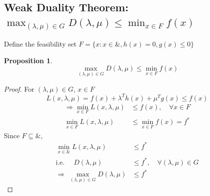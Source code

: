 \documentclass[11pt,a4paper]{article}
\newtheorem{proposition}{Proposition}
\begin{document}
\subsection{Weak Duality Theorem: $\max_{(\lambda,\mu)\in G}D(\lambda,\mu)\leq \min_{x\in F}f(x)$}
Define the feasibility set $F=\{x:x\in\&,h(x)=0,g(x)\leq 0\}$
\begin{proposition}
    $$\max_{(\lambda,\mu)\in G}D(\lambda,\mu)\leq \min_{x\in F}f(x)$$
\end{proposition}
\begin{proof}
    For $(\lambda,\mu)\in G$, $x\in F$
    $$L(x,\lambda,\mu)=f(x)+\lambda^T h(x)+\mu^T g(x)\leq f(x)$$
    \begin{equation}
        \begin{aligned}
            \Rightarrow	\min_{x\in F}L(x,\lambda,\mu)&\leq f(x),\quad \forall x\in F\\
            \min_{x\in F}L(x,\lambda,\mu)&\leq \min_{x\in F}f(x)=f^*
        \end{aligned}
        \nonumber
    \end{equation}
    Since $F\subseteq \&$,
    \begin{equation}
        \begin{aligned}
            \min_{x\in \&}L(x,\lambda,\mu)&\leq f^*\\
            \text{i.e. }\quad D(\lambda,\mu)&\leq f^*,\quad \forall (\lambda,\mu)\in G\\
            \Rightarrow	\ \max_{(\lambda,\mu)\in G}D(\lambda,\mu)&\leq f^*
        \end{aligned}
        \nonumber
    \end{equation}
\end{proof}
\end{document}
